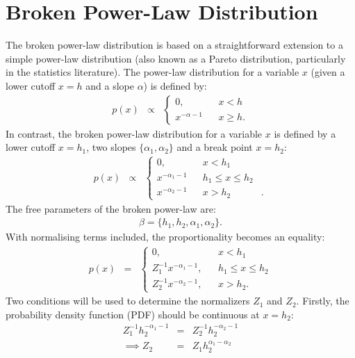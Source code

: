 \documentclass[manuscript]{aastex}
\begin{document}
\appendix

\section{Broken Power-Law Distribution}\label{power_law}
The broken power-law distribution is based on a straightforward extension
to a simple power-law distribution (also known as a Pareto distribution,
particularly in the statistics literature). The power-law distribution for a
variable $x$ (given a lower cutoff $x=h$ and a slope $\alpha$) is defined by:
\begin{eqnarray}
p(x) &\propto&
\left\{
\begin{array}{lcr}
0, & & x < h \\
x^{-\alpha - 1} & & x \geq h.
\end{array}
\right.
\end{eqnarray}
In contrast, the broken power-law distribution for a variable $x$ is defined by
a lower cutoff $x=h_1$, two slopes $\{\alpha_1, \alpha_2\}$ and a break point
$x=h_2$:
\begin{eqnarray}
p(x) &\propto&
\left\{
\begin{array}{lcrl}
0, & & x < h_1 & \\
x^{-\alpha_1 - 1} & & h_1 \leq x \leq h_2 & \\
x^{-\alpha_2 - 1} & & x > h_2 & .
\end{array}
\right.
\end{eqnarray}
The free parameters of the broken power-law are:
\begin{eqnarray}
\beta = \{h_1, h_2, \alpha_1, \alpha_2\}.
\end{eqnarray}
With normalising terms included, the proportionality becomes an equality:
\begin{eqnarray}
p(x) &=&
\left\{
\begin{array}{lcr}
0, & & x < h_1 \\
Z_1^{-1}x^{-\alpha_1 - 1}, & & h_1 \leq x \leq h_2 \\
Z_2^{-1}x^{-\alpha_2 - 1}, & & x > h_2.
\end{array}
\right.
\end{eqnarray}
Two conditions will be used to determine the normalizers $Z_1$ and $Z_2$.
Firstly, the probability density function (PDF) should be continuous at $x=h_2$:
\begin{eqnarray}
Z_1^{-1}h_2^{-\alpha_1 - 1} &=& Z_2^{-1}h_2^{-\alpha_2 - 1}\\
\implies
Z_2 &=& Z_1h_2^{\alpha_1-\alpha_2}
\end{eqnarray}
\end{document}
